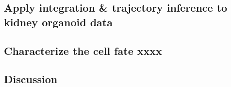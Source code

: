 \subsection{Apply integration \& trajectory inference to kidney organoid data}
\subsection{Characterize the cell fate xxxx}
\subsection{Discussion}

